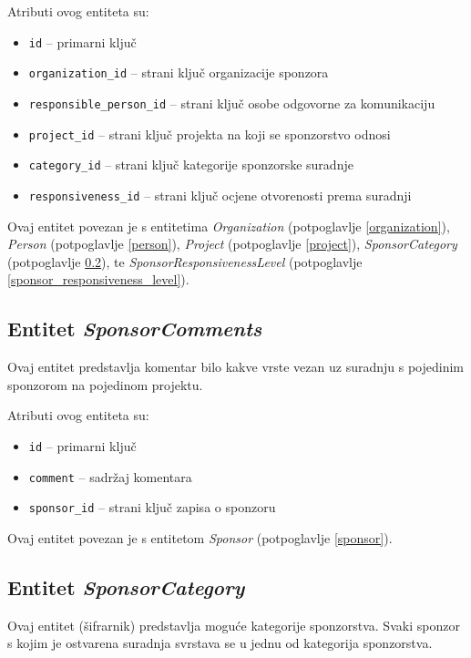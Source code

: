 \documentclass[times, utf8, diplomski]{fer}
\begin{document}
\medskip
Atributi ovog entiteta su:
\begin{itemize}
    \item \texttt{id} -- primarni ključ
    \item \texttt{organization\_id} -- strani ključ organizacije sponzora
    \item \texttt{responsible\_person\_id} -- strani ključ osobe odgovorne za
        komunikaciju
    \item \texttt{project\_id} -- strani ključ projekta na koji se sponzorstvo
        odnosi
    \item \texttt{category\_id} -- strani ključ kategorije sponzorske suradnje
    \item \texttt{responsiveness\_id} -- strani ključ ocjene otvorenosti prema
        suradnji
\end{itemize}

Ovaj entitet povezan je s entitetima \emph{Organization} (potpoglavlje
\ref{organization}), \emph{Person} (potpoglavlje \ref{person}), \emph{Project}
(potpoglavlje \ref{project}), \emph{SponsorCategory} (potpoglavlje
\ref{sponsor_category}), te \emph{SponsorResponsivenessLevel} (potpoglavlje
\ref{sponsor_responsiveness_level}).

\subsection{Entitet \emph{SponsorComments}} \label{sponsor_comments}

Ovaj entitet predstavlja komentar bilo kakve vrste vezan uz suradnju s pojedinim
sponzorom na pojedinom projektu.

\medskip
Atributi ovog entiteta su:
\begin{itemize}
    \item \texttt{id} -- primarni ključ
    \item \texttt{comment} -- sadržaj komentara
    \item \texttt{sponsor\_id} -- strani ključ zapisa o sponzoru
\end{itemize}

Ovaj entitet povezan je s entitetom \emph{Sponsor} (potpoglavlje \ref{sponsor}).

\subsection{Entitet \emph{SponsorCategory}} \label{sponsor_category}

Ovaj entitet (šifrarnik) predstavlja moguće kategorije sponzorstva. Svaki
sponzor s kojim je ostvarena suradnja svrstava se u jednu od kategorija
sponzorstva.
\end{document}
